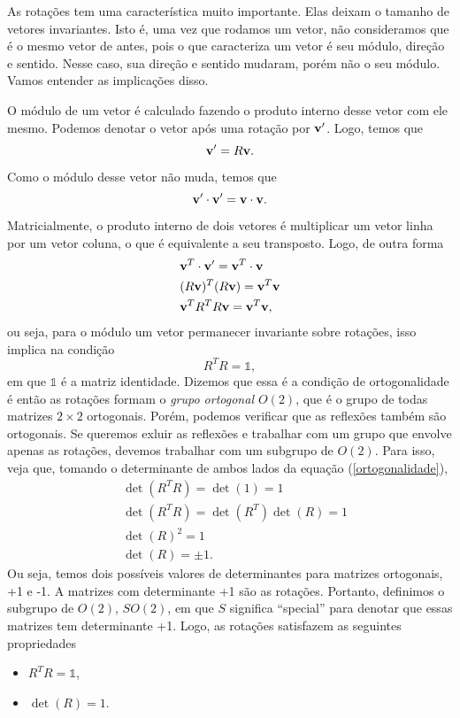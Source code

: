\documentclass{article}
\numberwithin{equation}{section}
\numberwithin{figure}{section}
\begin{document}
As rotações tem uma característica muito importante. Elas deixam o tamanho de vetores invariantes. Isto é, uma vez que rodamos um vetor, não consideramos que é o mesmo vetor de antes, pois o que caracteriza um vetor é seu módulo, direção e sentido. Nesse caso, sua direção e sentido mudaram, porém não o seu módulo. Vamos entender as implicações disso. 

O módulo de um vetor é calculado fazendo o produto interno desse vetor com ele mesmo. Podemos denotar o vetor após uma rotação por $\vb{v}'$. Logo, temos que 
\begin{equation}
	\vb{v}'=R\vb{v}.
\end{equation} 
Como o módulo desse vetor não muda, temos que 
\begin{equation}
	\vb{v}'\cdot \vb{v}'=\vb{v}\cdot \vb{v}.
\end{equation}
Matricialmente, o produto interno de dois vetores é multiplicar um vetor linha por um vetor coluna, o que é equivalente a seu transposto. Logo, de outra forma 
\begin{equation*}
\begin{split}
		&\vb{v}^T\cdot \vb{v}'=\vb{v}^T\cdot\vb{v}\\
		&(R\vb{v})^T(R\vb{v})=\vb{v}^T\vb{v}\\
		&\vb{v}^TR^TR\vb{v}=\vb{v}^T\vb{v},
\end{split}
\end{equation*}
ou seja, para o módulo um vetor permanecer invariante sobre rotações, isso implica na condição 
\begin{equation}\label{ortogonalidade}
	R^TR=\mathds{1},
\end{equation}
em que $\mathds{1}$ é a matriz identidade. Dizemos que essa é a condição de ortogonalidade é então as rotações formam o \textit{grupo ortogonal $O(2)$}, que é o grupo de todas matrizes $2\times2$ ortogonais. Porém, podemos verificar que as reflexões também são ortogonais. Se queremos exluir as reflexões e trabalhar com um grupo que envolve apenas as rotações, devemos trabalhar com um subgrupo de $O(2)$. Para isso, veja que, tomando o determinante de ambos lados da equação (\ref{ortogonalidade}), 
\begin{equation*}
	\begin{split}
		&\det(R^TR)=\det(1)=1\\
		&\det(R^TR)=\det (R^T)\det (R)=1\\
		&\det(R)^2=1\\
		&\det(R)=\pm 1.
	\end{split}
\end{equation*}
Ou seja, temos dois possíveis valores de determinantes para matrizes ortogonais, +1 e -1. A matrizes com determinante +1 são as rotações. Portanto, definimos o subgrupo de $O(2)$, $SO(2)$, em que $S$ significa ``special'' para denotar que essas matrizes tem determinante +1. Logo, as rotações satisfazem as seguintes propriedades
\begin{itemize}
	\item $R^TR=\mathds{1}$,
	\item $\det(R)=1$.
\end{itemize}
\end{document}
